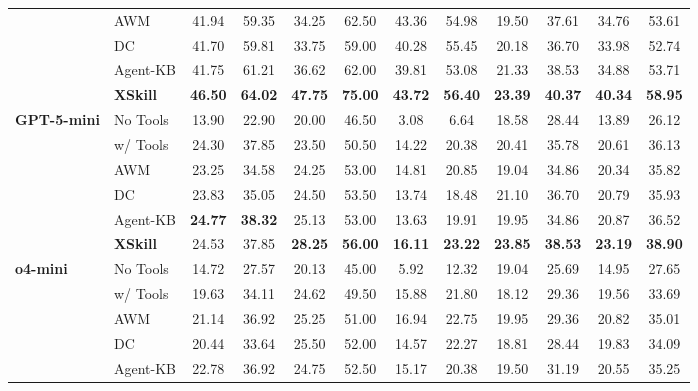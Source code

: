 \begin{table}[!ht]
\begin{center}
\begin{scriptsize}
{\begin{tabular}{llcccccccccc}
& AWM & 41.94 & 59.35 & 34.25 & 62.50 & 43.36 & 54.98 & 19.50 & 37.61 & 34.76 & 53.61 \\
& DC & 41.70 & 59.81 & 33.75 & 59.00 & 40.28 & 55.45 & 20.18 & 36.70 & 33.98 & 52.74 \\
& Agent-KB & 41.75 & 61.21 & 36.62 & 62.00 & 39.81 & 53.08 & 21.33 & 38.53 & 34.88 & 53.71 \\
& \cellcolor{gray!20}\textbf{XSkill} & \cellcolor{gray!20}\textbf{46.50} & \cellcolor{gray!20}\textbf{64.02} & \cellcolor{gray!20}\textbf{47.75} & \cellcolor{gray!20}\textbf{75.00} & \cellcolor{gray!20}\textbf{43.72} & \cellcolor{gray!20}\textbf{56.40} & \cellcolor{gray!20}\textbf{23.39} & \cellcolor{gray!20}\textbf{40.37} & \cellcolor{gray!20}\textbf{40.34} & \cellcolor{gray!20}\textbf{58.95} \\
\midrule
\multirow{6}{*}{\textbf{GPT-5-mini}}
& No Tools & 13.90 & 22.90 & 20.00 & 46.50 & 3.08 & 6.64 & 18.58 & 28.44 & 13.89 & 26.12 \\
& w/ Tools & 24.30 & 37.85 & 23.50 & 50.50 & 14.22 & 20.38 & 20.41 & 35.78 & 20.61 & 36.13 \\
& AWM & 23.25 & 34.58 & 24.25 & 53.00 & 14.81 & 20.85 & 19.04 & 34.86 & 20.34 & 35.82 \\
& DC & 23.83 & 35.05 & 24.50 & 53.50 & 13.74 & 18.48 & 21.10 & 36.70 & 20.79 & 35.93 \\
& Agent-KB & \textbf{24.77} & \textbf{38.32} & 25.13 & 53.00 & 13.63 & 19.91 & 19.95 & 34.86 & 20.87 & 36.52 \\
& \cellcolor{gray!20}\textbf{XSkill} & \cellcolor{gray!20}24.53 & \cellcolor{gray!20}37.85 & \cellcolor{gray!20}\textbf{28.25} & \cellcolor{gray!20}\textbf{56.00} & \cellcolor{gray!20}\textbf{16.11} & \cellcolor{gray!20}\textbf{23.22} & \cellcolor{gray!20}\textbf{23.85} & \cellcolor{gray!20}\textbf{38.53} & \cellcolor{gray!20}\textbf{23.19} & \cellcolor{gray!20}\textbf{38.90} \\
\midrule
\multirow{6}{*}{\textbf{o4-mini}}
& No Tools & 14.72 & 27.57 & 20.13 & 45.00 & 5.92 & 12.32 & 19.04 & 25.69 & 14.95 & 27.65 \\
& w/ Tools & 19.63 & 34.11 & 24.62 & 49.50 & 15.88 & 21.80 & 18.12 & 29.36 & 19.56 & 33.69 \\
& AWM & 21.14 & 36.92 & 25.25 & 51.00 & 16.94 & 22.75 & 19.95 & 29.36 & 20.82 & 35.01 \\
& DC & 20.44 & 33.64 & 25.50 & 52.00 & 14.57 & 22.27 & 18.81 & 28.44 & 19.83 & 34.09 \\
& Agent-KB & 22.78 & 36.92 & 24.75 & 52.50 & 15.17 & 20.38 & 19.50 & 31.19 & 20.55 & 35.25 \\

\end{tabular}}
\end{scriptsize}
\end{center}
\end{table}
